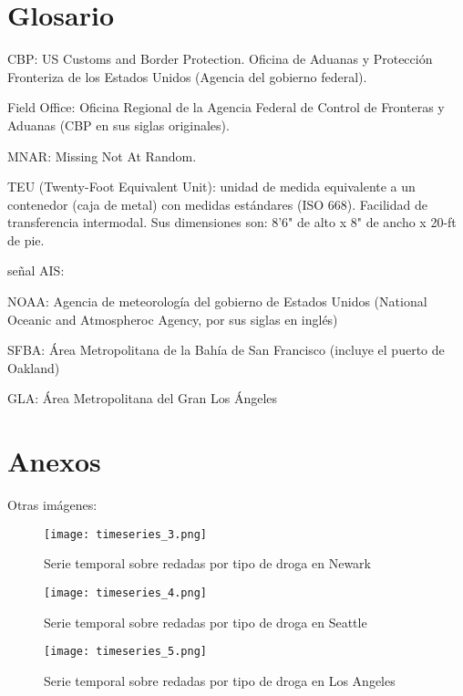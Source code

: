 \documentclass[12pt]{article}
\begin{document}
\section{Glosario}
\begin{description}
	\item CBP: US Customs and Border Protection. Oficina de Aduanas y Protección Fronteriza de los Estados Unidos (Agencia del gobierno federal).
	\item Field Office: Oficina Regional de la Agencia Federal de Control de Fronteras y Aduanas (CBP en sus siglas originales).
	\item MNAR: Missing Not At Random.
	\item TEU (Twenty-Foot Equivalent Unit): unidad de medida equivalente a un contenedor (caja de metal) con medidas estándares (ISO 668). Facilidad de transferencia intermodal. Sus dimensiones son: 8'6" de alto x 8" de ancho x 20-ft de pie.
	\item señal AIS:
	\item NOAA: Agencia de meteorología del gobierno de Estados Unidos (National Oceanic and Atmospheroc Agency, por sus siglas en inglés)
	\item SFBA: Área Metropolitana de la Bahía de San Francisco (incluye el puerto de Oakland)
	\item GLA: Área Metropolitana del Gran Los Ángeles
\end{description}

\newpage
\section{Anexos}
Otras imágenes:

\begin{figure}[H]
	\caption{\label{timeseries_3} Serie temporal sobre redadas por tipo de droga en Newark}
	\centering
	\hspace*{1cm}
	\texttt{[image: timeseries\_3.png]}
\end{figure}

\begin{figure}[H]
	\caption{\label{timeseries_4} Serie temporal sobre redadas por tipo de droga en Seattle}
	\centering
	\hspace*{1cm}
	\texttt{[image: timeseries\_4.png]}
\end{figure}

\begin{figure}[H]
	\caption{\label{timeseries_5} Serie temporal sobre redadas por tipo de droga en Los Angeles}
	\centering
	\hspace*{1cm}
	\texttt{[image: timeseries\_5.png]}
\end{figure}
\end{document}

